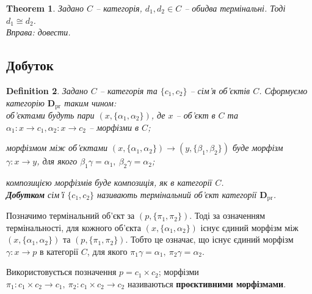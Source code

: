 \documentclass[a4paper, 10pt]{article}
\theoremstyle{theoremdd}
\newtheorem{theorem}{Theorem}[subsection]
\newtheorem{definition}[theorem]{Definition}
\begin{document}
\begin{theorem}
Задано $C$ -- категорія, $d_1,d_2 \in C$ -- обидва термінальні. Тоді $d_1 \cong d_2$.\\
\textit{Вправа: довести.}
\end{theorem}

\subsection{Добуток}
\begin{definition}
Задано $C$ -- категорія та $\{c_1,c_2\}$ -- сім'я об'єктів $C$. Сформуємо категорію $\textbf{D}_{\text{pr}}$ таким чином:\\
об'єктами будуть пари $(x,\{\alpha_1,\alpha_2\})$, де $x$ -- об'єкт в $C$ та $\alpha_1 \colon x \to c_1, \alpha_2 \colon x \to c_2$ -- морфізми в $C$;
\begin{figure}[H]
\centering
{}
\end{figure}
\noindent морфізмом між об'єктами $(x,\{\alpha_1,\alpha_2\}) \to (y,\{\beta_1,\beta_2\})$ буде морфізм $\gamma \colon x \to y$, для якого $\beta_1 \gamma = \alpha_1,\ \beta_2 \gamma = \alpha_2$;
\begin{figure}[H]
\centering
{}
\end{figure}
\noindent композицією морфізмів буде композиція, як в категорії $C$.\\
\textbf{Добутком} сім'ї $\{c_1,c_2\}$ називають термінальний об'єкт категорії $\textbf{D}_{\text{pr}}$.
\end{definition}

\noindent Позначимо термінальний об'єкт за $(p,\{\pi_1,\pi_2\})$. Тоді за означенням термінальності, для кожного об'єкта $(x,\{\alpha_1,\alpha_2\})$ існує єдиний морфізм між $(x,\{\alpha_1,\alpha_2\})$ та $(p,\{\pi_1,\pi_2\})$. Тобто це означає, що існує єдиний морфізм $\gamma \colon x \to p$ в категорії $C$, для якого $\pi_1 \gamma = \alpha_1,\ \pi_2 \gamma = \alpha_2$.
\begin{figure}[H]
\centering
{}
\end{figure}
\noindent  Використовується позначення $p = c_1 \times c_2$; морфізми $\pi_1 \colon c_1 \times c_2 \to c_1,\ \pi_2 \colon c_1 \times c_2 \to c_2$ називаються \textbf{проєктивними морфізмами}.
\end{document}
